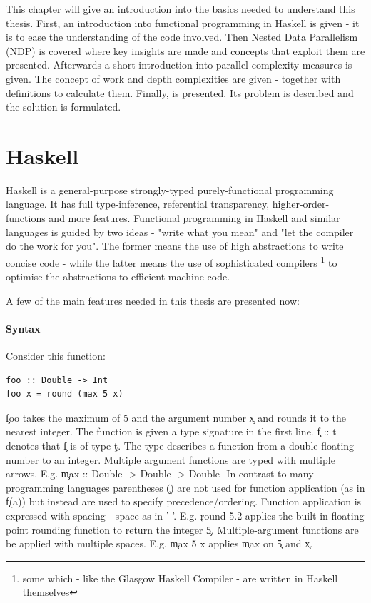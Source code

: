 

This chapter will give an introduction into the basics needed to
understand this thesis. First, an introduction into functional programming
in Haskell is given - it is to ease the understanding of the code involved.
Then Nested Data Parallelism (NDP) is covered where
key insights are made and concepts that exploit them are presented.
Afterwards a short introduction into parallel complexity measures is given.
The concept of work and depth complexities are given
- together with definitions to calculate them.
Finally, \algo is presented. Its problem is described and
the solution is formulated.

\section{Haskell}
  Haskell is a general-purpose strongly-typed purely-functional programming
  language. It has full type-inference, referential transparency, higher-order-functions
  and more features. Functional programming in Haskell and similar languages
  is guided by two ideas - "write what you mean" and "let the compiler do the work for you".
  The former means the use of high abstractions to write concise code -
  while the latter means the use of sophisticated compilers
  \footnote{some which - like the Glasgow Haskell Compiler - are written in Haskell themselves}
  to optimise the abstractions to efficient machine code.
  
  A few of the main features needed in this thesis are presented now:
  
  
  \paragraph{Syntax}
    Consider this function:
    \begin{lstlisting}
foo :: Double -> Int
foo x = round (max 5 x)
    \end{lstlisting}
    \c{foo} takes the maximum of 5 and the argument number \c{x} and
    rounds it to the nearest integer. The function is given a type
    signature in the first line. \c{f :: t} denotes that \c{f} is of type \c{t}.
    The type describes a function from a double floating number
    to an integer. Multiple argument functions are typed with multiple arrows.
    E.g. \c{max :: Double -> Double -> Double}-
    In contrast to many programming languages parentheses \c{()} are not used for function application
    (as in \c{f(a)}) but instead are used to specify precedence/ordering.
    Function application is expressed with spacing - space as in ' '. E.g. \c{round 5.2} applies the built-in
    floating point rounding function to return the integer \c{5}. Multiple-argument
    functions are be applied with multiple spaces. E.g. \c{max 5 x}
    applies \c{max} on \c{5} and \c{x}.
    
